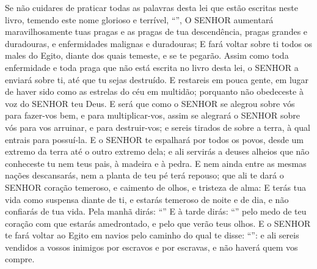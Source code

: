 {{  Se não cuidares de praticar todas as palavras desta lei que estão escritas neste livro, temendo este nome glorioso e terrível, \enquote{},
  O SENHOR aumentará maravilhosamente tuas pragas e as pragas de tua descendência, pragas grandes e duradouras, e enfermidades malignas e duradouras;
  E fará voltar sobre ti todos os males do Egito, diante dos quais temeste, e se te pegarão.
  Assim como toda enfermidade e toda praga que não está escrita no livro desta lei, o SENHOR a enviará sobre ti, até que tu sejas destruído.
  E restareis em pouca gente, em lugar de haver sido como as estrelas do céu em multidão; porquanto não obedeceste à voz do SENHOR teu Deus.
  E será que como o SENHOR se alegrou sobre vós para fazer-vos bem, e para multiplicar-vos, assim se alegrará o SENHOR sobre vós para vos arruinar, e para destruir-vos; e sereis tirados de sobre a terra, à qual entrais para possuí-la.
  E o SENHOR te espalhará por todos os povos, desde um extremo da terra até o outro extremo dela; e ali servirás a deuses alheios que não conheceste tu nem teus pais, à madeira e à pedra.
  E nem ainda entre as mesmas nações descansarás, nem a planta de teu pé terá repouso; que ali te dará o SENHOR coração temeroso, e caimento de olhos, e tristeza de alma:
  E terás tua vida como suspensa diante de ti, e estarás temeroso de noite e de dia, e não confiarás de tua vida.
  Pela manhã dirás: \enquote{} E à tarde dirás: \enquote{} pelo medo de teu coração com que estarás amedrontado, e pelo que verão teus olhos.
  E o SENHOR te fará voltar ao Egito em navios pelo caminho do qual te disse: \enquote{}: e ali sereis vendidos a vossos inimigos por escravos e por escravas, e não haverá quem vos compre}.
\par }

